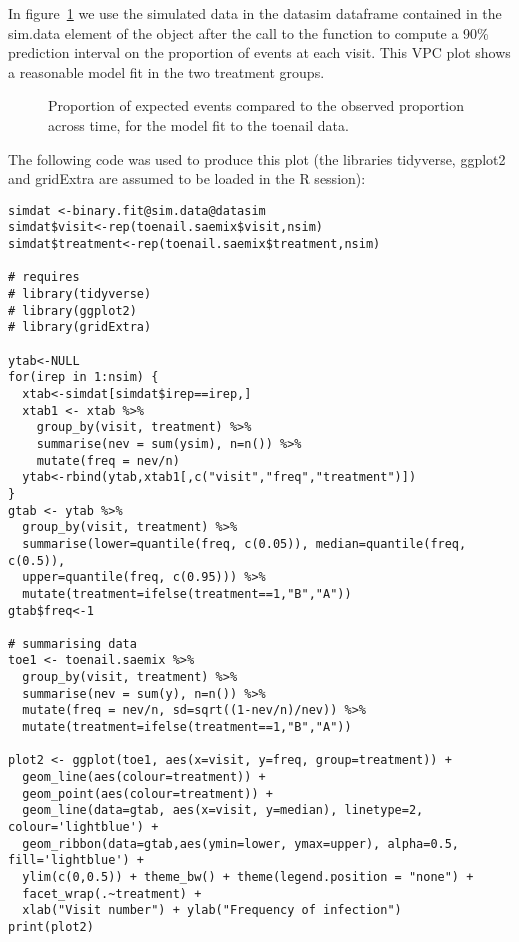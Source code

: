 In figure~\ref{fig:toenailPropVPC} we use the simulated data in the {\sf datasim} dataframe contained in the {\sf sim.data} element of the object after the call to the function to compute a 90\% prediction interval on the proportion of events at each visit. This VPC plot shows a reasonable model fit in the two treatment groups.

\begin{figure}[!h]
\begin{center}
\end{center}
\par \kern -0.5cm
\caption{Proportion of expected events compared to the observed proportion across time, for the model fit to the toenail data.} \label{fig:toenailPropVPC}
\end{figure}

The following code was used to produce this plot (the libraries {\sf tidyverse, ggplot2} and {\sf gridExtra} are assumed to be loaded in the {\sf R} session):
\begin{verbatim}
simdat <-binary.fit@sim.data@datasim
simdat$visit<-rep(toenail.saemix$visit,nsim)
simdat$treatment<-rep(toenail.saemix$treatment,nsim)
 
# requires 
# library(tidyverse)
# library(ggplot2)
# library(gridExtra)

ytab<-NULL
for(irep in 1:nsim) {
  xtab<-simdat[simdat$irep==irep,]
  xtab1 <- xtab %>%
    group_by(visit, treatment) %>%
    summarise(nev = sum(ysim), n=n()) %>%
    mutate(freq = nev/n)
  ytab<-rbind(ytab,xtab1[,c("visit","freq","treatment")])
}
gtab <- ytab %>%
  group_by(visit, treatment) %>%
  summarise(lower=quantile(freq, c(0.05)), median=quantile(freq, c(0.5)), 
  upper=quantile(freq, c(0.95))) %>%
  mutate(treatment=ifelse(treatment==1,"B","A"))
gtab$freq<-1

# summarising data
toe1 <- toenail.saemix %>%
  group_by(visit, treatment) %>%
  summarise(nev = sum(y), n=n()) %>%
  mutate(freq = nev/n, sd=sqrt((1-nev/n)/nev)) %>%
  mutate(treatment=ifelse(treatment==1,"B","A"))

plot2 <- ggplot(toe1, aes(x=visit, y=freq, group=treatment)) + 
  geom_line(aes(colour=treatment)) + 
  geom_point(aes(colour=treatment)) + 
  geom_line(data=gtab, aes(x=visit, y=median), linetype=2, colour='lightblue') + 
  geom_ribbon(data=gtab,aes(ymin=lower, ymax=upper), alpha=0.5, fill='lightblue') +
  ylim(c(0,0.5)) + theme_bw() + theme(legend.position = "none") + 
  facet_wrap(.~treatment) +
  xlab("Visit number") + ylab("Frequency of infection")
print(plot2)
\end{verbatim}


